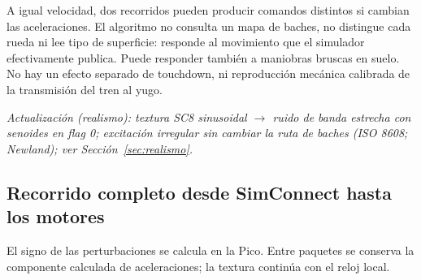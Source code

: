 \documentclass[11pt,a4paper]{article}
\begin{document}
A igual velocidad, dos recorridos pueden producir comandos distintos si cambian las aceleraciones. El algoritmo no consulta un mapa de baches, no distingue cada rueda ni lee tipo de superficie: responde al movimiento que el simulador efectivamente publica. Puede responder también a maniobras bruscas en suelo. No hay un efecto separado de touchdown, ni reproducción mecánica calibrada de la transmisión del tren al yugo.

\textit{Actualización (realismo): textura SC8 sinusoidal $\rightarrow$ ruido de banda estrecha con senoides en flag 0; excitación irregular sin cambiar la ruta de baches (ISO 8608; Newland); ver Sección~\ref{sec:realismo}.}

\subsection{Recorrido completo desde SimConnect hasta los motores}
\begin{center}
\end{center}
El signo de las perturbaciones se calcula en la Pico. Entre paquetes se conserva la componente calculada de aceleraciones; la textura continúa con el reloj local.
\end{document}
